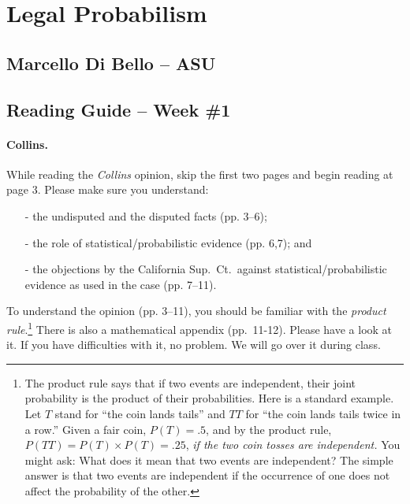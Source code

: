 \documentclass[12pt]{article}
\begin{document}

\thispagestyle{empty}

\vspace{-2cm}
\noindent
\section*{\large Legal Probabilism} 
\subsection*{Marcello Di Bello -- ASU}
\subsection*{Reading Guide -- Week \#1}



\vspace{1cm}

\paragraph{Collins.} While reading the \textit{Collins} opinion, skip the first two pages and begin 
reading at page 3. Please make sure you understand:

\begin{itemize}
\item[-] the undisputed and the disputed facts  (pp. 3--6);

\item[-] the role of statistical/probabilistic evidence (pp. 6,7); and

\item[-]the objections by the California Sup.\ Ct.\ against statistical/probabilistic evidence as used in the case (pp. 7--11).
\end{itemize}

To understand the opinion (pp. 3--11), you should be familiar with the \textit{product rule}.\footnote{The product rule says that if two events are independent, their joint probability is the product of their probabilities. Here is a standard example. Let $T$ stand for ``the coin lands tails'' and $TT$ for ``the coin lands tails twice in a row.'' Given a fair coin, $P(T)=.5$, and by the product rule, $P(TT)=P(T) \times P(T) =.25$, \textit{if the two coin tosses are independent.} You might ask: What does it mean that two events are independent? The simple answer is that two events are independent if the occurrence of one does not affect the probability of the other.} There is also a mathematical appendix (pp.\ 11-12). Please have a look at it.  If you have difficulties with it, no problem. We will go over it during class. 
\end{document}
